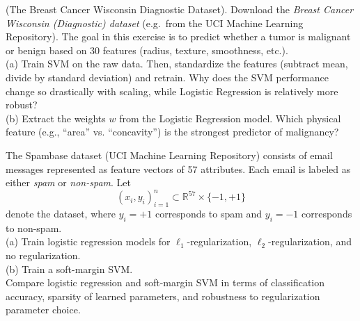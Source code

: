 \begin{myexercise}(The Breast Cancer Wisconsin Diagnostic Dataset).
Download the {\em Breast Cancer Wisconsin (Diagnostic) dataset} (e.g.\ from the UCI Machine Learning Repository). The goal in this exercise is to predict whether a tumor is malignant or benign based on 30 features (radius, texture, smoothness, etc.). \\
(a) Train  SVM on the raw data. Then, standardize the features (subtract mean, divide by standard deviation) and retrain. Why does the SVM performance change so drastically with scaling, while Logistic Regression is relatively more robust? \\
(b) Extract the weights $w$ from the Logistic Regression model. Which physical feature (e.g., ``area'' vs. ``concavity'') is the strongest predictor of malignancy? 
\end{myexercise}


\begin{myexercise}
The Spambase dataset (UCI Machine Learning Repository) consists of email messages represented as feature vectors of 57 attributes. Each email is labeled as either {\em spam} or {\em non-spam}. Let
$$
{(x_i, y_i)}_{i=1}^n \subset \mathbb{R}^{57} \times \{-1,+1\}
$$
denote the dataset, where $y_i = +1$ corresponds to spam and $y_i = -1$ corresponds to non-spam. \\
(a) Train logistic regression models for $\ell_1$-regularization, $\ell_2$-regularization, and 
no regularization. \\
(b) Train a soft-margin SVM. \\
Compare logistic regression and soft-margin SVM in terms of classification accuracy, sparsity of learned parameters, and robustness to regularization parameter choice.
\end{myexercise}


